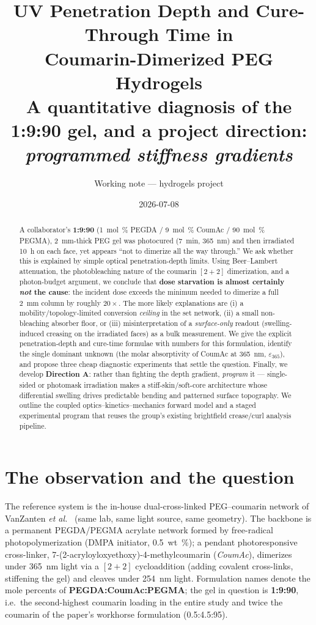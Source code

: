 \documentclass[11pt]{article}
\title{\textbf{UV Penetration Depth and Cure-Through Time in\\
Coumarin-Dimerized PEG Hydrogels}\\[4pt]
\large A quantitative diagnosis of the 1:9:90 gel, and a project direction:\\
\emph{programmed stiffness gradients}}
\author{Working note --- hydrogels project}
\date{2026-07-08}
\newcommand{\eps}{\varepsilon_{365}}
\begin{document}
\maketitle

\begin{abstract}
\noindent
A collaborator's \textbf{1:9:90} (\SI{1}{mol\%} PEGDA / \SI{9}{mol\%} CoumAc /
\SI{90}{mol\%} PEGMA), \SI{2}{mm}-thick PEG gel was photocured
(\SI{7}{min}, \SI{365}{nm}) and then irradiated \SI{10}{h} on each face, yet appears
``not to dimerize all the way through.'' We ask whether this is explained by simple
optical penetration-depth limits. Using Beer--Lambert attenuation, the photobleaching
nature of the coumarin $[2+2]$ dimerization, and a photon-budget argument, we conclude
that \textbf{dose starvation is almost certainly \emph{not} the cause}: the incident dose
exceeds the minimum needed to dimerize a full \SI{2}{mm} column by roughly
$20\times$. The more likely explanations are (i) a mobility/topology-limited conversion
\emph{ceiling} in the set network, (ii) a small non-bleaching absorber floor, or
(iii) misinterpretation of a \emph{surface-only} readout (swelling-induced creasing on the
irradiated faces) as a bulk measurement. We give the explicit penetration-depth and
cure-time formulae with numbers for this formulation, identify the single dominant unknown
(the molar absorptivity of CoumAc at \SI{365}{nm}, $\eps$), and propose three cheap
diagnostic experiments that settle the question. Finally, we develop \textbf{Direction A}:
rather than fighting the depth gradient, \emph{program} it --- single-sided or photomask
irradiation makes a stiff-skin/soft-core architecture whose differential swelling drives
predictable bending and patterned surface topography. We outline the coupled
optics--kinetics--mechanics forward model and a staged experimental program that reuses the
group's existing brightfield crease/curl analysis pipeline.
\end{abstract}

\tableofcontents

\section{The observation and the question}

The reference system is the in-house dual-cross-linked PEG--coumarin network of
VanZanten \emph{et al.}\ \cite{vanzanten2026} (same lab, same light source, same geometry).
The backbone is a permanent PEGDA/PEGMA acrylate network formed by free-radical
photopolymerization (DMPA initiator, \SI{0.5}{wt\%}); a pendant photoresponsive
cross-linker, 7-(2-acryloyloxyethoxy)-4-methylcoumarin (\emph{CoumAc}), dimerizes under
\SI{365}{nm} light via a $[2+2]$ cycloaddition (adding covalent cross-links, stiffening the
gel) and cleaves under \SI{254}{nm} light. Formulation names denote the mole percents of
\textbf{PEGDA:CoumAc:PEGMA}; the gel in question is \textbf{1:9:90}, i.e.\ the
second-highest coumarin loading in the entire study and twice the coumarin of the paper's
workhorse formulation (0.5:4.5:95).
\end{document}
